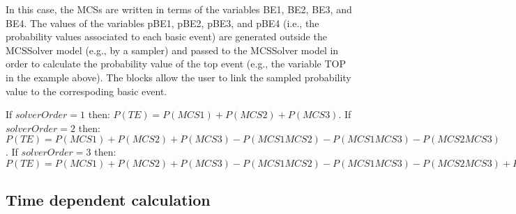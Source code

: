 In this case, the MCSs are written in terms of the variables BE1, BE2, BE3, and BE4.
The values of the variables pBE1, pBE2, pBE3, and pBE4 (i.e., the probability values associated to each basic event) are 
generated outside the MCSSolver model (e.g., by a sampler) and passed to the MCSSolver model in order to calculate the 
probability value of the top event (e.g., the variable TOP in the example above).
The  blocks allow the user to link the sampled probability value to the correspoding basic event.

If $solverOrder=1$ then: $P(TE) = P(MCS1)+P(MCS2)+P(MCS3)$.  
If $solverOrder=2$ then: $P(TE) = P(MCS1)+P(MCS2)+P(MCS3) - P(MCS1 MCS2) - P(MCS1 MCS3) - P(MCS2 MCS3)$.  
If $solverOrder=3$ then: $P(TE) = P(MCS1)+P(MCS2)+P(MCS3) - P(MCS1 MCS2) - P(MCS1 MCS3) - P(MCS2 MCS3) + P(MCS1 MCS2 MCS3)$

\subsection{Time dependent calculation}


